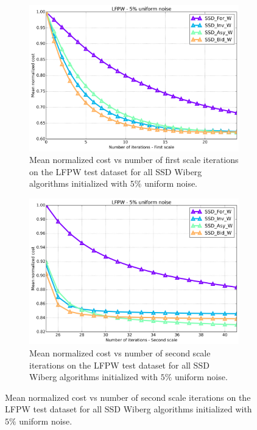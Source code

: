 \begin{figure}[p]
	\par\bigskip\bigskip
	\begin{subfigure}{0.48\textwidth}
	    \includegraphics[width=\textwidth]{experiments/algorithms/ssd_w/mean_cost_vs_iters1_ssd_w_5.png}
	    \caption{Mean normalized cost vs number of first scale iterations on the LFPW test dataset for all SSD Wiberg algorithms initialized with $5\%$ uniform noise.}
	    \label{fig:mean_cost_vs_iters1_ssd_w_5}
	\end{subfigure}
	\hfill
	\begin{subfigure}{0.48\textwidth}
	    \includegraphics[width=\textwidth]{experiments/algorithms/ssd_w/mean_cost_vs_iters2_ssd_w_5.png}
	    \caption{Mean normalized cost vs number of second scale iterations on the LFPW test dataset for all SSD Wiberg algorithms initialized with $5\%$ uniform noise.}

\end{subfigure}
\end{figure}
